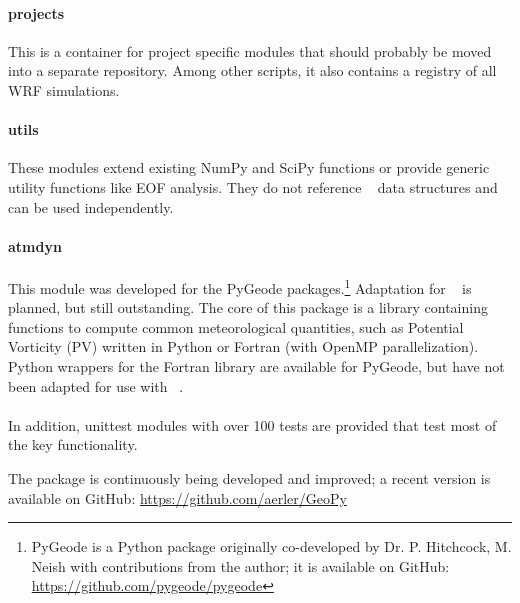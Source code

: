 \documentclass[letterpaper,12pt,headsepline,final]{scrartcl} %
\newcommand{\geopy}{\mbox{\color{teal} \sffamily {GeoPy}}}
\begin{document}
\paragraph{\color{darkgray} \ttfamily projects} This is a container for project specific modules that should probably be moved into a separate repository. Among other scripts, it also contains a registry of all WRF simulations.

\paragraph{\color{cyan} \ttfamily utils} These modules extend existing \textsf{NumPy} and \textsf{SciPy} functions or provide generic utility functions like EOF analysis. They do not reference \geopy{} data structures and can be used independently.

\paragraph{\color{brown} \ttfamily atmdyn} This module was developed for the \textsf{PyGeode} packages.\footnote{\textsf{PyGeode} is a Python package originally co-developed by Dr. P. Hitchcock, M. Neish with contributions from the author; it is available on GitHub: \url{https://github.com/pygeode/pygeode}} Adaptation for \geopy{} is planned, but still outstanding. The core of this package is a library containing functions to compute common meteorological quantities, such as Potential Vorticity (PV) written in Python or Fortran (with OpenMP parallelization). Python wrappers for the Fortran library are available for \textsf{PyGeode}, but have not been adapted for use with \geopy{}.

\paragraph{}
In addition, unittest modules with over 100 tests are provided that test most of the key functionality.

The package is continuously being developed and improved; a recent version is available on GitHub: \url{https://github.com/aerler/GeoPy}



\end{document}
